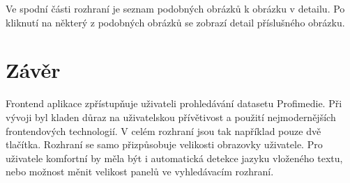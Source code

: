 Ve spodní části rozhraní je seznam podobných obrázků k obrázku v detailu. Po kliknutí na některý z podobných obrázků se zobrazí detail příslušného obrázku.

\section{Závěr}

Frontend aplikace zpřístupňuje uživateli prohledávání datasetu Profimedie. Při vývoji byl kladen důraz na uživatelskou přívětivost a použití nejmodernějších frontendových technologií. V celém rozhraní jsou tak například pouze dvě tlačítka. Rozhraní se samo přizpůsobuje velikosti obrazovky uživatele. Pro uživatele komfortní by měla být i automatická detekce jazyku vloženého textu, nebo možnost měnit velikost panelů ve vyhledávacím rozhraní.




